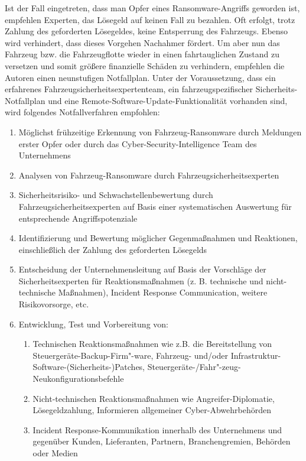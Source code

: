 Ist der Fall eingetreten, dass man Opfer eines Ransomware-Angriffs geworden ist, empfehlen Experten, 
das Lösegeld auf keinen Fall zu bezahlen. Oft erfolgt, trotz Zahlung des geforderten Lösegeldes, keine 
Entsperrung des Fahrzeugs. Ebenso wird verhindert, dass dieses Vorgehen Nachahmer fördert. 
\newline
Um aber nun das Fahrzeug bzw. die Fahrzeugflotte wieder in einen fahrtauglichen Zustand zu versetzen und 
somit größere finanzielle Schäden zu verhindern, empfehlen die Autoren einen neunstufigen Notfallplan. 
Unter der Voraussetzung, dass ein erfahrenes Fahrzeugsicherheitsexpertenteam, ein fahrzeugspezifischer 
Sicherheits-Notfallplan und eine Remote-Software-Update-Funktionalität vorhanden sind, wird folgendes 
Notfallverfahren empfohlen:

\begin{enumerate}
    \item Möglichst frühzeitige Erkennung von Fahrzeug-Ransomware durch Meldungen erster Opfer 
    oder durch das Cyber-Security-Intelligence Team des Unternehmens
    \item Analysen von Fahrzeug-Ransomware durch Fahrzeugsicherheitsexperten
    \item Sicherheitsrisiko- und Schwachstellenbewertung durch Fahrzeugsicherheitsexperten auf Basis 
    einer systematischen Auswertung für entsprechende Angriffspotenziale 
    \item Identifizierung und Bewertung möglicher Gegenmaßnahmen und Reaktionen, einschließlich der 
    Zahlung des geforderten Lösegelds
    \item Entscheidung der Unternehmensleitung auf Basis der Vorschläge der Sicherheitsexperten für 
    Reaktionsmaßnahmen (z. B. technische und nicht-technische Maßnahmen), Incident Response Communication, 
    weitere Risikovorsorge, etc.
    \item Entwicklung, Test und Vorbereitung von:
    \begin{enumerate}
        \item Technischen Reaktionsmaßnahmen wie z.B. die Bereitstellung von Steuergeräte-Backup-Firm"-ware, 
        Fahrzeug- und/oder Infrastruktur-Software-(Sicherheits-)Patches, Steuergeräte-/Fahr"-zeug-
        Neukonfigurationsbefehle
        \item Nicht-technischen Reaktionsmaßnahmen wie Angreifer-Diplomatie, Lösegeldzahlung, Informieren 
        allgemeiner Cyber-Abwehrbehörden
        \item Incident Response-Kommunikation innerhalb des Unternehmens und gegenüber Kunden, Lieferanten, 
        Partnern, Branchengremien, Behörden oder Medien
    \end{enumerate}


\end{enumerate}
